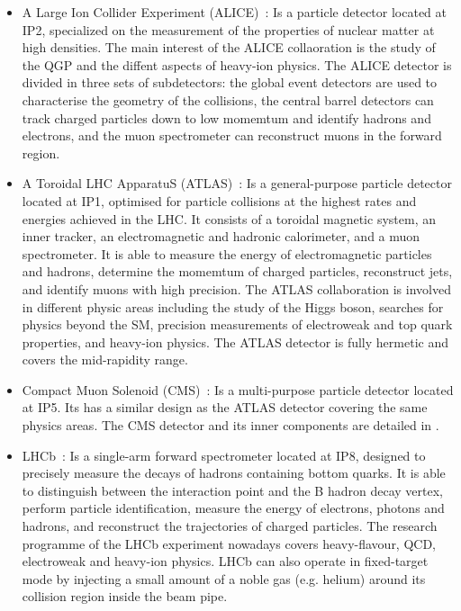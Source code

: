 \begin{itemize}

\item A Large Ion Collider Experiment (ALICE)~\cite{ALICE}: Is a particle detector located at IP2, specialized on the measurement of the properties of nuclear matter at high densities. The main interest of the ALICE collaoration is the study of the QGP and the diffent aspects of heavy-ion physics. The ALICE detector is divided in three sets of subdetectors: the global event detectors are used to characterise the geometry of the collisions, the central barrel detectors can track charged particles down to low momemtum and identify hadrons and electrons, and the muon spectrometer can reconstruct muons in the forward region.

\item A Toroidal LHC ApparatuS (ATLAS)~\cite{ATLAS}: Is a general-purpose particle detector located at IP1, optimised for particle collisions at the highest rates and energies achieved in the LHC. It consists of a toroidal magnetic system, an inner tracker, an electromagnetic and hadronic calorimeter, and a muon spectrometer. It is able to measure the energy of electromagnetic particles and hadrons, determine the momemtum of charged particles, reconstruct jets, and identify muons with high precision. The ATLAS collaboration is involved in different physic areas including the study of the Higgs boson, searches for physics beyond the SM, precision measurements of electroweak and top quark properties, and heavy-ion physics. The ATLAS detector is fully hermetic and covers the mid-rapidity range.

\item Compact Muon Solenoid (CMS)~\cite{CMS}: Is a multi-purpose particle detector located at IP5. Its has a similar design as the ATLAS detector covering the same physics areas. The CMS detector and its inner components are detailed in .

\item LHCb~\cite{LHCb}: Is a single-arm forward spectrometer located at IP8, designed to precisely measure the decays of hadrons containing bottom quarks. It is able to distinguish between the interaction point and the B hadron decay vertex, perform particle identification, measure the energy of electrons, photons and hadrons, and reconstruct the trajectories of charged particles. The research programme of the LHCb experiment nowadays covers heavy-flavour, QCD, electroweak and heavy-ion physics. LHCb can also operate in fixed-target mode by injecting a small amount of a noble gas (e.g. helium) around its collision region inside the beam pipe.

\end{itemize}

